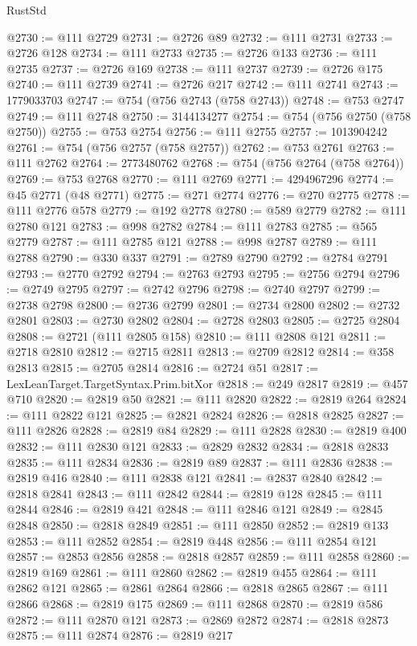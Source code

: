 \begin{lexlean}{RustStd}
\begin{coremodule}
@2730 := @111 @2729
@2731 := @2726 @89
@2732 := @111 @2731
@2733 := @2726 @128
@2734 := @111 @2733
@2735 := @2726 @133
@2736 := @111 @2735
@2737 := @2726 @169
@2738 := @111 @2737
@2739 := @2726 @175
@2740 := @111 @2739
@2741 := @2726 @217
@2742 := @111 @2741
@2743 := 1779033703
@2747 := @754 (@756 @2743 (@758 @2743))
@2748 := @753 @2747
@2749 := @111 @2748
@2750 := 3144134277
@2754 := @754 (@756 @2750 (@758 @2750))
@2755 := @753 @2754
@2756 := @111 @2755
@2757 := 1013904242
@2761 := @754 (@756 @2757 (@758 @2757))
@2762 := @753 @2761
@2763 := @111 @2762
@2764 := 2773480762
@2768 := @754 (@756 @2764 (@758 @2764))
@2769 := @753 @2768
@2770 := @111 @2769
@2771 := 4294967296
@2774 := @45 @2771 (@48 @2771)
@2775 := @271 @2774
@2776 := @270 @2775
@2778 := @111 @2776 @578
@2779 := @192 @2778
@2780 := @589 @2779
@2782 := @111 @2780 @121
@2783 := @998 @2782
@2784 := @111 @2783
@2785 := @565 @2779
@2787 := @111 @2785 @121
@2788 := @998 @2787
@2789 := @111 @2788
@2790 := @330 @337
@2791 := @2789 @2790
@2792 := @2784 @2791
@2793 := @2770 @2792
@2794 := @2763 @2793
@2795 := @2756 @2794
@2796 := @2749 @2795
@2797 := @2742 @2796
@2798 := @2740 @2797
@2799 := @2738 @2798
@2800 := @2736 @2799
@2801 := @2734 @2800
@2802 := @2732 @2801
@2803 := @2730 @2802
@2804 := @2728 @2803
@2805 := @2725 @2804
@2808 := @2721 (@111 @2805 @158)
@2810 := @111 @2808 @121
@2811 := @2718 @2810
@2812 := @2715 @2811
@2813 := @2709 @2812
@2814 := @358 @2813
@2815 := @2705 @2814
@2816 := @2724 @51
@2817 := LexLeanTarget.TargetSyntax.Prim.bitXor
@2818 := @249 @2817
@2819 := @457 @710
@2820 := @2819 @50
@2821 := @111 @2820
@2822 := @2819 @264
@2824 := @111 @2822 @121
@2825 := @2821 @2824
@2826 := @2818 @2825
@2827 := @111 @2826
@2828 := @2819 @84
@2829 := @111 @2828
@2830 := @2819 @400
@2832 := @111 @2830 @121
@2833 := @2829 @2832
@2834 := @2818 @2833
@2835 := @111 @2834
@2836 := @2819 @89
@2837 := @111 @2836
@2838 := @2819 @416
@2840 := @111 @2838 @121
@2841 := @2837 @2840
@2842 := @2818 @2841
@2843 := @111 @2842
@2844 := @2819 @128
@2845 := @111 @2844
@2846 := @2819 @421
@2848 := @111 @2846 @121
@2849 := @2845 @2848
@2850 := @2818 @2849
@2851 := @111 @2850
@2852 := @2819 @133
@2853 := @111 @2852
@2854 := @2819 @448
@2856 := @111 @2854 @121
@2857 := @2853 @2856
@2858 := @2818 @2857
@2859 := @111 @2858
@2860 := @2819 @169
@2861 := @111 @2860
@2862 := @2819 @455
@2864 := @111 @2862 @121
@2865 := @2861 @2864
@2866 := @2818 @2865
@2867 := @111 @2866
@2868 := @2819 @175
@2869 := @111 @2868
@2870 := @2819 @586
@2872 := @111 @2870 @121
@2873 := @2869 @2872
@2874 := @2818 @2873
@2875 := @111 @2874
@2876 := @2819 @217

\end{coremodule}
\end{lexlean}
